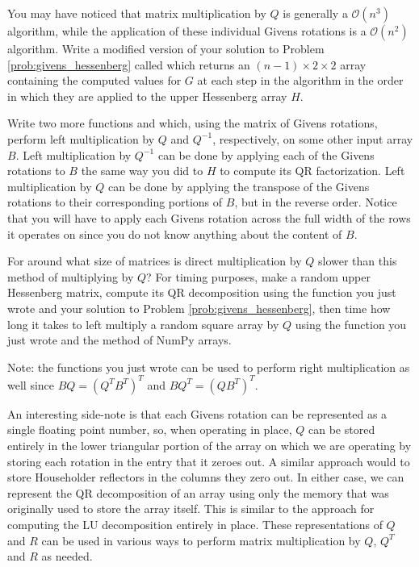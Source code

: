 \begin{problem}
\label{prob:givens_hessenberg_modified}
You may have noticed that matrix multiplication by $Q$ is generally a $\mathcal{O} \left( n^3 \right)$ algorithm, while the application of these individual Givens rotations is a $\mathcal{O} \left( n^2 \right)$ algorithm.
Write a modified version of your solution to Problem \ref{prob:givens_hessenberg} called  which returns 
an $(n-1) \times 2 \times 2$ array containing the computed values for $G$ at each step in the algorithm in the order in which they are applied to the upper Hessenberg array $H$.

Write two more functions  and  which, using the matrix of Givens rotations, perform left multiplication 
by $Q$ and $Q^{-1}$, respectively, on some other input array $B$.
Left multiplication by $Q^{-1}$ can be done by applying each of the Givens rotations to $B$ the same way you did to $H$ to compute its QR factorization.
Left multiplication by $Q$ can be done by applying the transpose of the Givens rotations to their corresponding portions of $B$, but in the reverse order.
Notice that you will have to apply each Givens rotation across the full width of the rows it operates on since you do not know anything about the content of $B$.

For around what size of matrices is direct multiplication by $Q$ slower than this method of multiplying by $Q$?
For timing purposes, make a random upper Hessenberg matrix, compute its QR decomposition using the function you just wrote and your solution to Problem \ref{prob:givens_hessenberg}, then time how long it takes to left multiply a random square array by $Q$ using the function you just wrote and the  method of NumPy arrays.

Note: the functions you just wrote can be used to perform right multiplication as well since $B Q = \left(Q^T B^T \right)^T$ and $B Q^T = \left( Q B^T \right)^T$.
\end{problem}

An interesting side-note is that each Givens rotation can be represented as a single floating point number, so, when operating in place, $Q$ can be stored entirely in the lower triangular portion of the array on which we are operating by storing each rotation in the entry that it zeroes out.
A similar approach would to store Householder reflectors in the columns they zero out.
In either case, we can represent the QR decomposition of an array using only the memory that was originally used to store the array itself.
This is similar to the approach  for computing the LU decomposition entirely in place.
These representations of $Q$ and $R$ can be used in various ways to perform matrix multiplication by $Q$, $Q^T$ and $R$ as needed.

